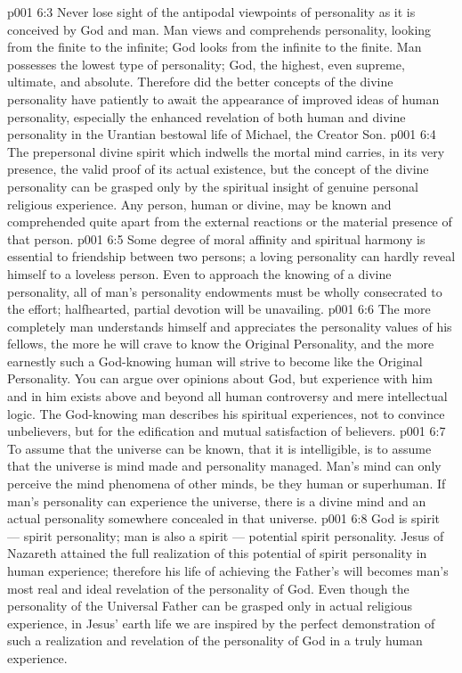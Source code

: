 \vs p001 6:3 Never lose sight of the antipodal viewpoints of personality as it is conceived by God and man. Man views and comprehends personality, looking from the finite to the infinite; God looks from the infinite to the finite. Man possesses the lowest type of personality; God, the highest, even supreme, ultimate, and absolute. Therefore did the better concepts of the divine personality have patiently to await the appearance of improved ideas of human personality, especially the enhanced revelation of both human and divine personality in the Urantian bestowal life of Michael, the Creator Son.
\vs p001 6:4 \pc The prepersonal divine spirit which indwells the mortal mind carries, in its very presence, the valid proof of its actual existence, but the concept of the divine personality can be grasped only by the spiritual insight of genuine personal religious experience. Any person, human or divine, may be known and comprehended quite apart from the external reactions or the material presence of that person.
\vs p001 6:5 Some degree of moral affinity and spiritual harmony is essential to friendship between two persons; a loving personality can hardly reveal himself to a loveless person. Even to approach the knowing of a divine personality, all of man’s personality endowments must be wholly consecrated to the effort; halfhearted, partial devotion will be unavailing.
\vs p001 6:6 The more completely man understands himself and appreciates the personality values of his fellows, the more he will crave to know the Original Personality, and the more earnestly such a God\hyp{}knowing human will strive to become like the Original Personality. You can argue over opinions about God, but experience with him and in him exists above and beyond all human controversy and mere intellectual logic. The God\hyp{}knowing man describes his spiritual experiences, not to convince unbelievers, but for the edification and mutual satisfaction of believers.
\vs p001 6:7 \pc To assume that the universe can be known, that it is intelligible, is to assume that the universe is mind made and personality managed. Man’s mind can only perceive the mind phenomena of other minds, be they human or superhuman. If man’s personality can experience the universe, there is a divine mind and an actual personality somewhere concealed in that universe.
\vs p001 6:8 \pc God is spirit --- spirit personality; man is also a spirit --- potential spirit personality. Jesus of Nazareth attained the full realization of this potential of spirit personality in human experience; therefore his life of achieving the Father’s will becomes man’s most real and ideal revelation of the personality of God. Even though the personality of the Universal Father can be grasped only in actual religious experience, in Jesus’ earth life we are inspired by the perfect demonstration of such a realization and revelation of the personality of God in a truly human experience.
